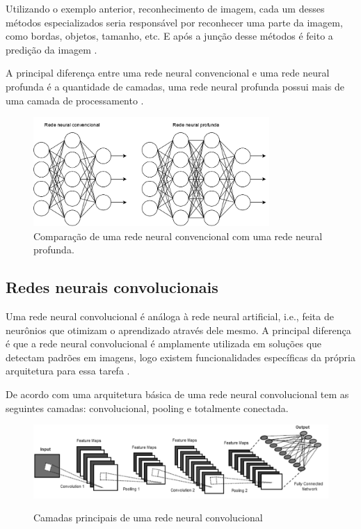 \documentclass[
	12pt,				%
	openright,			%
	twoside,			%
	a4paper,			%
	english,			%
	french,				%
	spanish,			%
	brazil				%
	]{abntex2}
\begin{document}
Utilizando o exemplo anterior, reconhecimento de imagem, cada um desses métodos especializados seria responsável por reconhecer uma parte da imagem, como bordas, objetos, tamanho, etc. E após a junção desse métodos é feito a predição da imagem \cite{marti2017aprendizado}.

A principal diferença entre uma rede neural convencional e uma rede neural profunda é a quantidade de camadas, uma rede neural profunda possui mais de uma camada de processamento .

\begin{figure}[H]
	\centering
	\includegraphics[width=0.8\textwidth]{figures/redes_neurais.png}
	\caption{Comparação de uma rede neural convencional com uma rede neural profunda.}	
	\label{fig:redes_neurais}
\end{figure}

\subsection{Redes neurais convolucionais}
Uma rede neural convolucional é análoga à rede neural artificial, i.e., feita de neurônios que otimizam o aprendizado através dele mesmo. A principal diferença é que a rede neural convolucional é amplamente utilizada em soluções que detectam padrões em imagens, logo existem funcionalidades específicas da própria arquitetura para essa tarefa \cite{oshea2015introduction}.

De acordo com  uma arquitetura básica de uma rede neural convolucional tem as seguintes camadas: convolucional, pooling e totalmente conectada.

\begin{figure}[H]
	\caption{Camadas principais de uma rede neural convolucional}
	\centering %
	\includegraphics[width=15cm]{figures/arquitetura_cnn.png} %
	\label{fig:arquitetura_cnn}
\end{figure}
\end{document}
